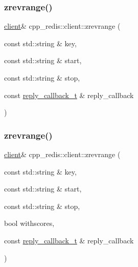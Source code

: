 \subsubsection{\texorpdfstring{zrevrange()}{zrevrange()}\hspace{0.1cm}{\footnotesize\ttfamily [7/9]}}
{\footnotesize\ttfamily \hyperlink{classcpp__redis_1_1client}{client}\& cpp\+\_\+redis\+::client\+::zrevrange (\begin{DoxyParamCaption}\item[{const std\+::string \&}]{key,  }\item[{const std\+::string \&}]{start,  }\item[{const std\+::string \&}]{stop,  }\item[{const \hyperlink{classcpp__redis_1_1client_a061a1140d36d2eaeda82b09a0bb3f9f2}{reply\+\_\+callback\+\_\+t} \&}]{reply\+\_\+callback }\end{DoxyParamCaption})}

\mbox{\label{classcpp__redis_1_1client_ae4cef5e8cba4196287bf89375889a2e4}} 
\subsubsection{\texorpdfstring{zrevrange()}{zrevrange()}\hspace{0.1cm}{\footnotesize\ttfamily [8/9]}}
{\footnotesize\ttfamily \hyperlink{classcpp__redis_1_1client}{client}\& cpp\+\_\+redis\+::client\+::zrevrange (\begin{DoxyParamCaption}\item[{const std\+::string \&}]{key,  }\item[{const std\+::string \&}]{start,  }\item[{const std\+::string \&}]{stop,  }\item[{bool}]{withscores,  }\item[{const \hyperlink{classcpp__redis_1_1client_a061a1140d36d2eaeda82b09a0bb3f9f2}{reply\+\_\+callback\+\_\+t} \&}]{reply\+\_\+callback }\end{DoxyParamCaption})}

\mbox{\label{classcpp__redis_1_1client_a973fb4632a18f70bec092f3c9659045e}} 
